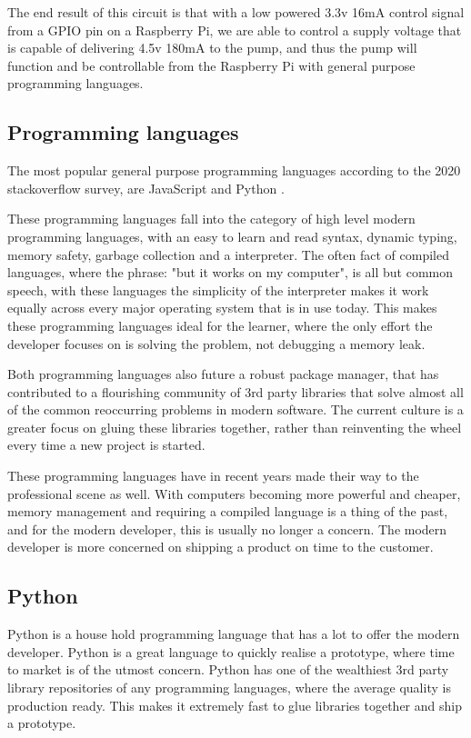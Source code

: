 \documentclass[a4paper,12pt,twoside,openright,titlepage]{book}
\begin{document}
The end result of this circuit is that with a low powered 3.3v 16mA control signal from a GPIO pin on a Raspberry Pi, we are able to control a supply voltage that is capable of delivering 4.5v 180mA to the pump, and thus the pump will function and be controllable from the Raspberry Pi with general purpose programming languages.

\subsection{Programming languages}
The most popular general purpose programming languages according to the 2020 stackoverflow survey, are JavaScript and Python \cite{stackoverflow_survey}.

These programming languages fall into the category of high level modern programming languages, with an easy to learn and read syntax, dynamic typing, memory safety, garbage collection and a interpreter. 
The often fact of compiled languages, where the phrase: "but it works on my computer", is all but common speech, with these languages the simplicity of the interpreter makes it work equally across every major operating system that is in use today.
This makes these programming languages ideal for the learner, where the only effort the developer focuses on is solving the problem, not debugging a memory leak.

Both programming languages also future a robust package manager, that has contributed to a flourishing community of 3rd party libraries that solve almost all of the common reoccurring problems in modern software. The current culture is a greater focus on gluing these libraries together, rather than reinventing the wheel every time a new project is started.

These programming languages have in recent years made their way to the professional scene as well. With computers becoming more powerful and cheaper, memory management and requiring a compiled language is a thing of the past, and for the modern developer, this is usually no longer a concern.
The modern developer is more concerned on shipping a product on time to the customer.

\subsection{Python}
Python is a house hold programming language that has a lot to offer the modern developer. Python is a great language to quickly realise a prototype, where time to market is of the utmost concern.
Python has one of the wealthiest 3rd party library repositories of any programming languages, where the average quality is production ready. This makes it extremely fast to glue libraries together and ship a prototype.
\end{document}
